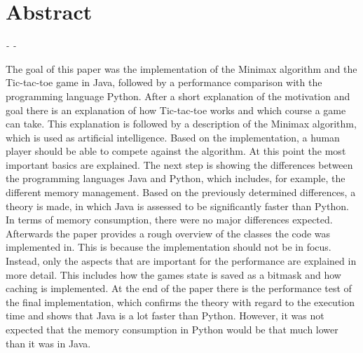 \chapter*{Abstract}

\begin{flushright}
    \textit{\DerAutorDerArbeit - \DieMatrikelnummer - \DieKursbezeichnung}
\end{flushright}

\textbf{\DerTitelDerArbeitEnglisch}

The goal of this paper was the implementation of the Minimax algorithm and the Tic-tac-toe game in Java,
followed by a performance comparison with the programming language Python. After a short explanation
of the motivation and goal there is an explanation of how Tic-tac-toe works and which course a game can take.
This explanation is followed by a description of the Minimax algorithm, which is used as artificial intelligence.
Based on the implementation, a human player should be able to compete against the algorithm. At this point the
most important basics are explained. The next step is showing the differences between the programming languages
Java and Python, which includes, for example, the different memory management. Based on the previously determined
differences, a theory is made, in which Java is assessed to be significantly faster than Python. In terms of
memory consumption, there were no major differences expected. Afterwards the paper provides a rough 
overview of the classes the code was implemented in. This is because the implementation should not be in focus. 
Instead, only the aspects that are important for the performance are explained in more detail.
This includes how the games state is saved as a bitmask and how caching is implemented. At the end of the paper
there is the performance test of the final implementation, which confirms the theory with regard to the execution
time and shows that Java is a lot faster than Python. However, it was not expected that the memory consumption
in Python would be that much lower than it was in Java.